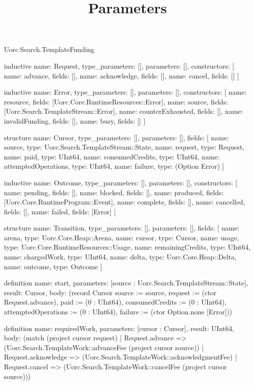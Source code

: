 \begin{lexlean}{Uorc.Search.TemplateFunding}
\title{Parameters}
\begin{semanticmodule}
inductive{
  name: Request,
  type_parameters: [],
  parameters: [],
  constructors: [
    {name: advance, fields: []},
    {name: acknowledge, fields: []},
    {name: cancel, fields: []}
  ]
}

inductive{
  name: Error,
  type_parameters: [],
  parameters: [],
  constructors: [
    {name: resource, fields: [Uorc.Core.RuntimeResources::Error]},
    {name: source, fields: [Uorc.Search.TemplateStream::Error]},
    {name: counterExhausted, fields: []},
    {name: invalidFunding, fields: []},
    {name: busy, fields: []}
  ]
}

structure{
  name: Cursor,
  type_parameters: [],
  parameters: [],
  fields: [
    {name: source, type: Uorc.Search.TemplateStream::State},
    {name: request, type: Request},
    {name: paid, type: UInt64},
    {name: consumedCredits, type: UInt64},
    {name: attemptedOperations, type: UInt64},
    {name: failure, type: (Option Error)}
  ]
}

inductive{
  name: Outcome,
  type_parameters: [],
  parameters: [],
  constructors: [
    {name: pending, fields: []},
    {name: blocked, fields: []},
    {name: produced, fields: [Uorc.Core.RuntimeProgram::Event]},
    {name: complete, fields: []},
    {name: cancelled, fields: []},
    {name: failed, fields: [Error]}
  ]
}

structure{
  name: Transition,
  type_parameters: [],
  parameters: [],
  fields: [
    {name: arena, type: Uorc.Core.Heap::Arena},
    {name: cursor, type: Cursor},
    {name: usage, type: Uorc.Core.RuntimeResources::Usage},
    {name: remainingCredits, type: UInt64},
    {name: chargedWork, type: UInt64},
    {name: delta, type: Uorc.Core.Heap::Delta},
    {name: outcome, type: Outcome}
  ]
}

definition{
  name: start,
  parameters: [source : Uorc.Search.TemplateStream::State],
  result: Cursor,
  body: (record Cursor {source := source, request := (ctor Request.advance), paid := (0 : UInt64), consumedCredits := (0 : UInt64), attemptedOperations := (0 : UInt64), failure := (ctor Option.none [Error])})
}

definition{
  name: requiredWork,
  parameters: [cursor : Cursor],
  result: UInt64,
  body: (match (project cursor request)
    | Request.advance => (Uorc.Search.TemplateWork::advanceFee (project cursor source))
    | Request.acknowledge => (Uorc.Search.TemplateWork::acknowledgmentFee)
    | Request.cancel => (Uorc.Search.TemplateWork::cancelFee (project cursor source)))
}


\end{semanticmodule}
\end{lexlean}
